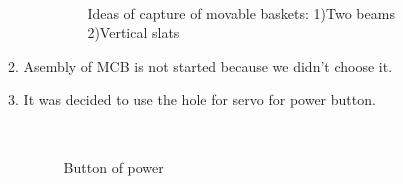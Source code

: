 \begin{enumerate}
\begin{enumerate}
\begin{enumerate}
			\begin{figure}[H]
				\begin{minipage}[h]{0.2\linewidth}
					\center  
				\end{minipage}
				\begin{minipage}[h]{0.6\linewidth}
					\caption{Ideas of capture of movable baskets: 1)Two beams 2)Vertical slats %
						}
				\end{minipage}
			\end{figure}
			
		\end{enumerate}
		
		\item Asembly of MCB is not started because we didn't choose it.
		
		\item It was decided to use the hole for servo for power button.
		
		\begin{figure}[H]
			\begin{minipage}[h]{0.2\linewidth}
				\center  
			\end{minipage}
			\begin{minipage}[h]{0.6\linewidth}
				\caption{Button of power}
			\end{minipage}
		\end{figure}
		

\end{enumerate}
\end{enumerate}
